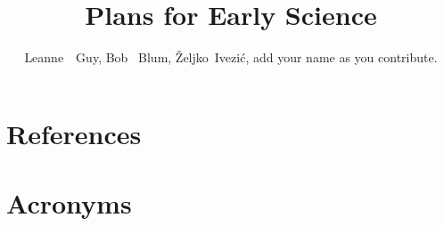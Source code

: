 \documentclass[DM,authoryear,toc]{lsstdoc}
\title{Plans for Early Science}
\author{%
Leanne~~Guy, Bob~ Blum, \v{Z}eljko~Ivezi\'{c}, add your name as you contribute.
}
\date{\vcsDate}
\begin{document}
\maketitle


\label{sec:scidrive}
\label{sec:com}
\label{sec:too}
\label{sec:stat}
\label{sec:pp}


\appendix
\section{References} \label{sec:bib}
\renewcommand{\refname}{} %


\section{Acronyms} \label{sec:acronyms}

\end{document}
